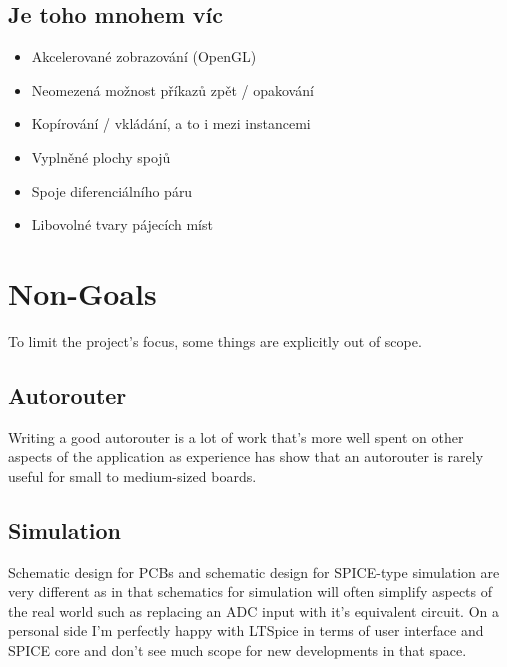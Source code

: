 \documentclass[letterpaper,10pt,czech]{sphinxmanual}
\begin{document}
\noindent{}


\section{Je toho mnohem víc}
\label{\detokenize{feature-overview:je-toho-mnohem-vic}}\begin{itemize}
\item {} 
Akcelerované zobrazování (OpenGL)

\item {} 
Neomezená možnost příkazů zpět / opakování

\item {} 
Kopírování / vkládání, a to i mezi instancemi

\item {} 
Vyplněné plochy spojů

\item {} 
Spoje diferenciálního páru

\item {} 
Libovolné tvary pájecích míst

\end{itemize}


\chapter{Non-Goals}
\label{\detokenize{non-goals:non-goals}}\label{\detokenize{non-goals::doc}}
To limit the project’s focus, some things are explicitly out of scope.


\section{Autorouter}
\label{\detokenize{non-goals:autorouter}}
Writing a good autorouter is a lot of work that’s more well spent on
other aspects of the application as experience has show that an
autorouter is rarely useful for small to medium-sized boards.


\section{Simulation}
\label{\detokenize{non-goals:simulation}}
Schematic design for PCBs and schematic design for SPICE-type
simulation are very different as in that schematics for simulation will
often simplify aspects of the real world such as replacing an ADC input
with it’s equivalent circuit. On a personal side I’m perfectly happy
with LTSpice in terms of user interface and SPICE core and don’t see much
scope for new developments in that space.
\end{document}
